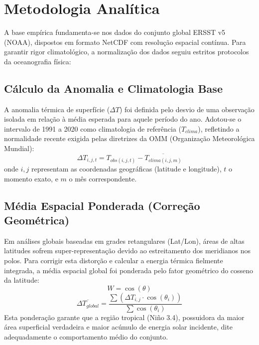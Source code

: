 \documentclass[11pt,a4paper]{article}
\begin{document}
\section{Metodologia Analítica}
A base empírica fundamenta-se nos dados do conjunto global ERSST v5 (NOAA), dispostos em formato NetCDF com resolução espacial contínua. Para garantir rigor climatológico, a normalização dos dados seguiu estritos protocolos da oceanografia física:

\subsection{Cálculo da Anomalia e Climatologia Base}
A anomalia térmica de superfície ($\Delta T$) foi definida pelo desvio de uma observação isolada em relação à média esperada para aquele período do ano. Adotou-se o intervalo de 1991 a 2020 como climatologia de referência ($T_{clima}$), refletindo a normalidade recente exigida pelas diretrizes da OMM (Organização Meteorológica Mundial):
\begin{equation}
    \Delta T_{i,j,t} = T_{obs(i,j,t)} - \overline{T_{clima(i,j,m)}}
\end{equation}
onde $i,j$ representam as coordenadas geográficas (latitude e longitude), $t$ o momento exato, e $m$ o mês correspondente.

\subsection{Média Espacial Ponderada (Correção Geométrica)}
Em análises globais baseadas em grades retangulares (Lat/Lon), áreas de altas latitudes sofrem super-representação devido ao estreitamento dos meridianos nos polos. Para corrigir esta distorção e calcular a energia térmica fielmente integrada, a média espacial global foi ponderada pelo fator geométrico do cosseno da latitude:
\begin{equation}
    W = \cos(\theta)
\end{equation}
\begin{equation}
    \overline{\Delta T_{global}} = \frac{\sum (\Delta T_{i,j} \cdot \cos(\theta_i))}{\sum \cos(\theta_i)}
\end{equation}
Esta ponderação garante que a região tropical (Niño 3.4), possuidora da maior área superficial verdadeira e maior acúmulo de energia solar incidente, dite adequadamente o comportamento médio do conjunto.
\end{document}
